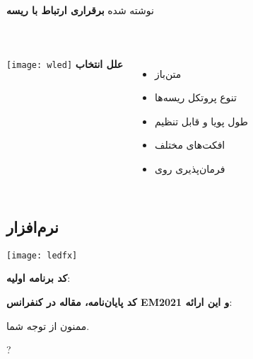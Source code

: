 \documentclass{beamer}
\begin{document}
\begin{frame}{\subsecname{} نوشته شده}{\secname}
  \textbf{برقراری ارتباط با ریسه}

  \begin{latin}
    \inputminted[firstline=40,lastline=48]%
    {C}{espws2811/src/ws2811.c}
  \end{latin}

  \begin{latin}
    \inputminted[firstline=15,lastline=21]%
    {C}{espws2811/src/ws2811.c}
  \end{latin}
\end{frame}

\begin{frame}{\subsecname{} }{\secname}
  \begin{columns}
      \texttt{[image: wled]}
      \textbf{علل انتخاب }
      \vspace{1em}

      \begin{itemize}
        \item متن‌باز
        \item تنوع پروتکل ریسه‌ها
        \item طول پویا و قابل تنظیم
        \item افکت‌های مختلف
        \item فرمان‌پذیری روی 
      \end{itemize}
  \end{columns}
\end{frame}


\subsection{نرم‌افزار}

\begin{frame}{\subsecname}
  \textbf{}
  \vspace{1em}

  \texttt{[image: ledfx]}
\end{frame}

\begin{frame}
  \large
  \textbf{کد برنامه اولیه}:
  \vspace{.7em}

  \vspace{2em}

  \textbf{کد پایان‌نامه، مقاله در کنفرانس EM2021 و این ارائه}:
  \vspace{.7em}

\end{frame}

\begin{frame}
  \Large ممنون از توجه شما.
  \par\vspace{2em}
  \Huge ?
\end{frame}
\end{document}
